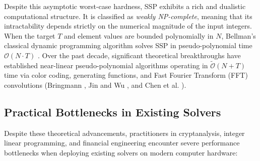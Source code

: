 \documentclass[journal,onecolumn,11pt]{IEEEtran}
\begin{document}
Despite this asymptotic worst-case hardness, SSP exhibits a rich and dualistic computational structure. It is classified as \textit{weakly NP-complete}, meaning that its intractability depends strictly on the numerical magnitude of the input integers. When the target $T$ and element values are bounded polynomially in $N$, Bellman's classical dynamic programming algorithm solves SSP in pseudo-polynomial time $\mathcal{O}(N \cdot T)$ \cite{pisinger1997minimal}. Over the past decade, significant theoretical breakthroughs have established near-linear pseudo-polynomial algorithms operating in $\widetilde{\mathcal{O}}(N + T)$ time via color coding, generating functions, and Fast Fourier Transform (FFT) convolutions (Bringmann \cite{bringmann2017near}, Jin and Wu \cite{jin2019simple}, and Chen et al. \cite{chen2024improved}).

\subsection{Practical Bottlenecks in Existing Solvers}
Despite these theoretical advancements, practitioners in cryptanalysis, integer linear programming, and financial engineering encounter severe performance bottlenecks when deploying existing solvers on modern computer hardware:
\end{document}
